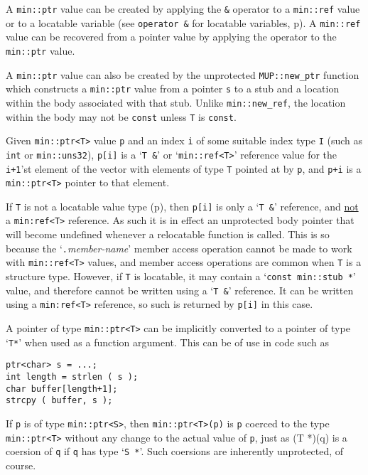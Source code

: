 \documentclass[12pt]{article}
\newcommand{\pagref}[1]{p\pageref{#1}}
\newcommand{\EOL}{\penalty \exhyphenpenalty}
\newenvironment{indpar}[1][0.3in]%
	{\begin{list}{}%
		     {\setlength{\itemsep}{0in}%
		      \setlength{\topsep}{0in}%
		      \setlength{\parsep}{1ex}%
		      \setlength{\labelwidth}{#1}%
		      \setlength{\leftmargin}{#1}%
		      \addtolength{\leftmargin}{\labelsep}}%
	 \item}%
	{\end{list}}
\begin{document}
A {\tt min::\EOL ptr\TARG} value can be created by applying the
{\tt \&} operator to a {\tt min::\EOL ref\TARG} value or to a
locatable variable (see {\tt operator \&} for locatable variables,
\pagref{LOCATABLE_VAR_PTR}).
A {\tt min::\EOL ref\TARG} value can be recovered from a
pointer value by applying the
{\tt *} operator to the {\tt min::\EOL ptr\TARG} value.

A {\tt min::\EOL ptr\TARG} value can also be created by the
unprotected {\tt MUP::\EOL new\_\EOL ptr} function which
constructs a {\tt min::\EOL ptr\TARG} value
from a pointer {\tt s} to a stub and a location
within the body associated with that stub.
Unlike {\tt min::\EOL new\_\EOL ref},
the location within the body may not be {\tt const} unless {\tt T} is
{\tt const}.

Given {\tt min::\EOL ptr<T>} value {\tt p} and an index {\tt i} of some
suitable index type {\tt I} (such as {\tt int} or {\tt min::\EOL uns32}),
{\tt p[i]} is a `{\tt T \&}' or `{\tt min::\EOL ref<T>}'
reference value for the {\tt i+1}'st element of
the vector with elements of type {\tt T} pointed at by {\tt p}, and
{\tt p+i} is a {\tt min::\EOL ptr<T>} pointer to that element.

If {\tt T} is not a locatable value type
(\pagref{LOCATABLE-VALUE}), then
{\tt p[i]} is only a `{\tt T \&}' reference, and
\underline{not} a {\tt min:\EOL ref<T>} reference.  As such it is
in effect an unprotected body pointer that will become undefined whenever
a relocatable function is called.  This is so because the
`{\tt .}{\em member-name}' member access operation cannot be made to work with
{\tt min::\EOL ref<T>} values, and member access operations are
common when {\tt T} is a structure type.  However, if {\tt T} is locatable,
it may contain a `{\tt const min::\EOL stub *}' value,
and therefore cannot be written using a
`{\tt T \&}' reference.  It can be written using a
{\tt min:\EOL ref<T>} reference, so such is returned by {\tt p[i]} in
this case.

A pointer of type {\tt min::ptr<T>} can be implicitly converted to a
pointer of type `{\tt T*}' when used as a function argument.
This can be of use in code such as
\begin{indpar}\begin{verbatim}
ptr<char> s = ...;
int length = strlen ( s );
char buffer[length+1];
strcpy ( buffer, s );
\end{verbatim}\end{indpar}

If {\tt p} is of type {\tt min::ptr<S>}, then {\tt min::ptr<T>(p)} is
{\tt p} coerced to the type {\tt min::\EOL ptr<T>} without any change to the
actual value of {\tt p}, just as {(T *)(q)} is a coersion of {\tt q}
if {\tt q} has type `{\tt S *}'.  Such coersions are inherently
unprotected, of course.
\end{document}
